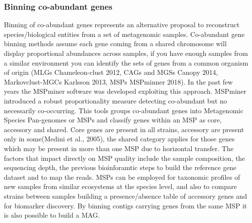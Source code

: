 \documentclass{article}
\begin{document}
\subsubsection{Binning co-abundant genes}
Binning of co-abundant genes represents an alternative proposal to reconstruct species/biological entities from a set of metagenomic samples.
Co-abundant gene binning methods assume each gene coming from a shared chromosome will display proportional abundances across samples, if you have enough samples from a similar environment you can identify the sets of genes from a common organism of origin (MLGs Chameleon-clust 2012, CAGs and MGSs Canopy 2014, Markovclust-MGCs Karlsson 2013, MSPs MSPminner 2018).
In the past few years the MSPminer software was developed exploiting this approach. MSPminer introduced a robust proportionality measure detecting co-abundant but no necessarily co-occurring.
This tools groups co-abundant genes into Metagenomic Species Pan-genomes or \glspl{MSP} and classify genes within an MSP as core, accessory and shared. Core genes are present in all strains, accessory are present only in some(Medini et al., 2005), the shared category applies for those genes which may be present in more than one MSP due to horizontal transfer.
The factors that impact directly on \gls{MSP} quality include the sample composition, the sequencing depth, the previous bioinforamtic steps to build the reference gene dataset and to map the reads.
MSPs can be employed for taxonomic profiles of new samples from similar ecosystems at the species level, and also to compare strains between samples building a presence/absence table of accessory genes and for biomarker discovery.
By binning contigs carrying genes from the same MSP it is also possible to build a \gls{MAG}.

\end{document}
